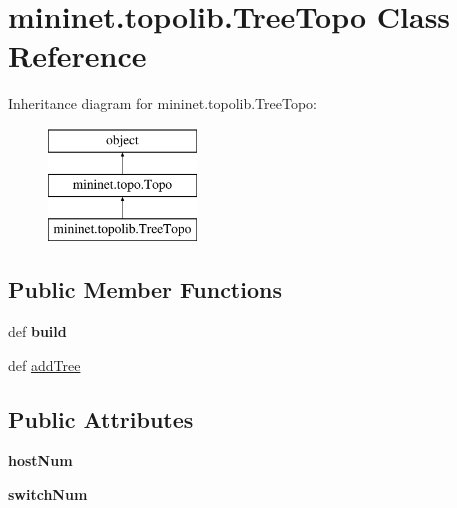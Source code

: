 \hypertarget{classmininet_1_1topolib_1_1TreeTopo}{\section{mininet.\-topolib.\-Tree\-Topo Class Reference}
\label{classmininet_1_1topolib_1_1TreeTopo}
}
Inheritance diagram for mininet.\-topolib.\-Tree\-Topo\-:\begin{figure}[H]
\begin{center}
\leavevmode
\includegraphics[height=3.000000cm]{classmininet_1_1topolib_1_1TreeTopo}
\end{center}
\end{figure}
\subsection*{Public Member Functions}
\begin{DoxyCompactItemize}
\item 
\hypertarget{classmininet_1_1topolib_1_1TreeTopo_ae224f88e5afb1edc38f78a896b877ae1}{def {\bfseries build}}\label{classmininet_1_1topolib_1_1TreeTopo_ae224f88e5afb1edc38f78a896b877ae1}

\item 
def \hyperlink{classmininet_1_1topolib_1_1TreeTopo_aefae3c81588ee4c60168e1e8918abcd9}{add\-Tree}
\end{DoxyCompactItemize}
\subsection*{Public Attributes}
\begin{DoxyCompactItemize}
\item 
\hypertarget{classmininet_1_1topolib_1_1TreeTopo_abf208411938f3fc286234eed0889c833}{{\bfseries host\-Num}}\label{classmininet_1_1topolib_1_1TreeTopo_abf208411938f3fc286234eed0889c833}

\item 
\hypertarget{classmininet_1_1topolib_1_1TreeTopo_a41b1eefd3cc623350ec11971c9031ad0}{{\bfseries switch\-Num}}\label{classmininet_1_1topolib_1_1TreeTopo_a41b1eefd3cc623350ec11971c9031ad0}

\end{DoxyCompactItemize}

